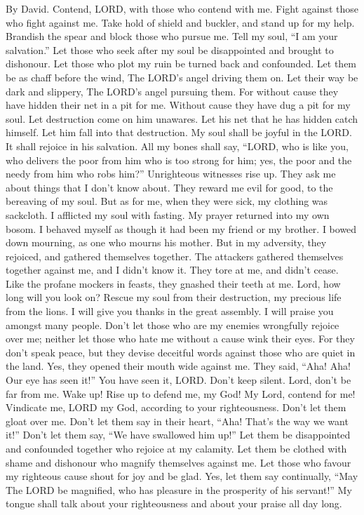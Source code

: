 By David.  Contend, LORD, with those who contend with me.
Fight against those who fight against me.  Take hold of
shield and buckler, and stand up for my help.  Brandish the
spear and block those who pursue me. Tell my soul, ``I am your
salvation.''  Let those who seek after my soul be
disappointed and brought to dishonour. Let those who plot my ruin be
turned back and confounded.  Let them be as chaff before the
wind, The LORD's angel driving them on.  Let their way be
dark and slippery, The LORD's angel pursuing them.  For
without cause they have hidden their net in a pit for me. Without cause
they have dug a pit for my soul.  Let destruction come on
him unawares. Let his net that he has hidden catch himself. Let him fall
into that destruction.  My soul shall be joyful in the LORD.
It shall rejoice in his salvation.  All my bones shall say,
``LORD, who is like you, who delivers the poor from him who is too
strong for him; yes, the poor and the needy from him who robs him?''
 Unrighteous witnesses rise up. They ask me about things
that I don't know about.  They reward me evil for good, to
the bereaving of my soul.  But as for me, when they were
sick, my clothing was sackcloth. I afflicted my soul with fasting. My
prayer returned into my own bosom.  I behaved myself as
though it had been my friend or my brother. I bowed down mourning, as
one who mourns his mother.  But in my adversity, they
rejoiced, and gathered themselves together. The attackers gathered
themselves together against me, and I didn't know it. They tore at me,
and didn't cease.  Like the profane mockers in feasts, they
gnashed their teeth at me.  Lord, how long will you look
on? Rescue my soul from their destruction, my precious life from the
lions.  I will give you thanks in the great assembly. I
will praise you amongst many people.  Don't let those who
are my enemies wrongfully rejoice over me; neither let those who hate me
without a cause wink their eyes.  For they don't speak
peace, but they devise deceitful words against those who are quiet in
the land.  Yes, they opened their mouth wide against me.
They said, ``Aha! Aha! Our eye has seen it!''  You have
seen it, LORD. Don't keep silent. Lord, don't be far from me.
 Wake up! Rise up to defend me, my God! My Lord, contend
for me!  Vindicate me, LORD my God, according to your
righteousness. Don't let them gloat over me.  Don't let
them say in their heart, ``Aha! That's the way we want it!'' Don't let
them say, ``We have swallowed him up!''  Let them be
disappointed and confounded together who rejoice at my calamity. Let
them be clothed with shame and dishonour who magnify themselves against
me.  Let those who favour my righteous cause shout for joy
and be glad. Yes, let them say continually, ``May The LORD be magnified,
who has pleasure in the prosperity of his servant!''  My
tongue shall talk about your righteousness and about your praise all day
long.

